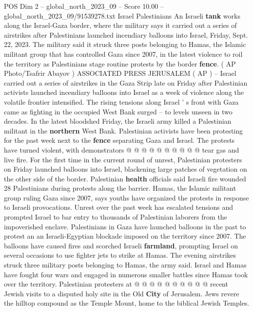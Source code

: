 \begin{textsample}{POS Dim 2 – global\_north\_2023\_09 – Score 10.00 – global\_north\_2023\_09/91539278.txt}  \label{ex:f2_pos_375}
Israel Palestinians An Israeli \textbf{tank} works along the Israel-Gaza border, where the military says it carried out a series of airstrikes after Palestinians launched incendiary balloons into Israel, Friday, Sept. 22, 2023.
The military said it struck three posts belonging to Hamas, the Islamic militant group that has controlled Gaza since 2007, in the latest violence to roil the territory as Palestinians stage routine protests by the border \textbf{fence}. ( AP Photo/Tsafrir Abayov ) ASSOCIATED PRESS JERUSALEM ( AP ) -- Israel carried out a series of airstrikes in the Gaza Strip late on Friday after Palestinian activists launched incendiary balloons into Israel as a week of violence along the volatile frontier intensified.
The rising tensions along Israel ' s front with Gaza came as fighting in the occupied West Bank surged -- to levels unseen in two decades.
In the latest bloodshed Friday, the Israeli army killed a Palestinian militant in the \textbf{northern} West Bank.
Palestinian activists have been protesting for the past week next to the \textbf{fence} separating Gaza and Israel.
The protests have turned violent, with demonstrators @ @ @ @ @ @ @ @ @ @ tear gas and live fire.
For the first time in the current round of unrest, Palestinian protesters on Friday launched balloons into Israel, blackening large patches of vegetation on the other side of the border.
Palestinian \textbf{health} officials said Israeli fire wounded 28 Palestinians during protests along the barrier.
Hamas, the Islamic militant group ruling Gaza since 2007, says youths have organized the protests in response to Israeli provocations.
Unrest over the past week has escalated tensions and prompted Israel to bar entry to thousands of Palestinian laborers from the impoverished enclave.
Palestinians in Gaza have launched balloons in the past to protest an an Israeli-Egyptian blockade imposed on the territory since 2007.
The balloons have caused fires and scorched Israeli \textbf{farmland}, prompting Israel on several occasions to use fighter jets to strike at Hamas.
The evening airstrikes struck three military posts belonging to Hamas, the army said.
Israel and Hamas have fought four wars and engaged in numerous smaller battles since Hamas took over the territory.
Palestinian protesters at @ @ @ @ @ @ @ @ @ @ recent Jewish visits to a disputed holy site in the Old \textbf{City} of Jerusalem.
Jews revere the hilltop compound as the Temple Mount, home to the biblical Jewish Temples.

\end{textsample}
